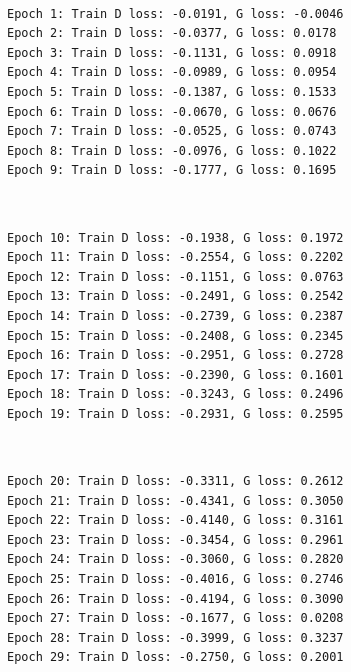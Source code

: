 \documentclass[11pt]{article}
\begin{document}
    \begin{center}
    \end{center}
    { \hspace*{\fill} \\}
    
    \begin{Verbatim}[commandchars=\\\{\}]
Epoch 1: Train D loss: -0.0191, G loss: -0.0046
Epoch 2: Train D loss: -0.0377, G loss: 0.0178
Epoch 3: Train D loss: -0.1131, G loss: 0.0918
Epoch 4: Train D loss: -0.0989, G loss: 0.0954
Epoch 5: Train D loss: -0.1387, G loss: 0.1533
Epoch 6: Train D loss: -0.0670, G loss: 0.0676
Epoch 7: Train D loss: -0.0525, G loss: 0.0743
Epoch 8: Train D loss: -0.0976, G loss: 0.1022
Epoch 9: Train D loss: -0.1777, G loss: 0.1695

    \end{Verbatim}

    \begin{center}
    \end{center}
    { \hspace*{\fill} \\}
    
    \begin{Verbatim}[commandchars=\\\{\}]
Epoch 10: Train D loss: -0.1938, G loss: 0.1972
Epoch 11: Train D loss: -0.2554, G loss: 0.2202
Epoch 12: Train D loss: -0.1151, G loss: 0.0763
Epoch 13: Train D loss: -0.2491, G loss: 0.2542
Epoch 14: Train D loss: -0.2739, G loss: 0.2387
Epoch 15: Train D loss: -0.2408, G loss: 0.2345
Epoch 16: Train D loss: -0.2951, G loss: 0.2728
Epoch 17: Train D loss: -0.2390, G loss: 0.1601
Epoch 18: Train D loss: -0.3243, G loss: 0.2496
Epoch 19: Train D loss: -0.2931, G loss: 0.2595

    \end{Verbatim}

    \begin{center}
    \end{center}
    { \hspace*{\fill} \\}
    
    \begin{Verbatim}[commandchars=\\\{\}]
Epoch 20: Train D loss: -0.3311, G loss: 0.2612
Epoch 21: Train D loss: -0.4341, G loss: 0.3050
Epoch 22: Train D loss: -0.4140, G loss: 0.3161
Epoch 23: Train D loss: -0.3454, G loss: 0.2961
Epoch 24: Train D loss: -0.3060, G loss: 0.2820
Epoch 25: Train D loss: -0.4016, G loss: 0.2746
Epoch 26: Train D loss: -0.4194, G loss: 0.3090
Epoch 27: Train D loss: -0.1677, G loss: 0.0208
Epoch 28: Train D loss: -0.3999, G loss: 0.3237
Epoch 29: Train D loss: -0.2750, G loss: 0.2001

    \end{Verbatim}
\end{document}
